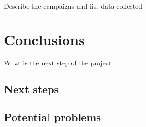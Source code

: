 \documentclass{nwureport}
\begin{document}
Describe the campaigns and list data collected


\chapter{Conclusions}

What is the next step of the project 

\section{Next steps}

\section{Potential problems}


\begin{spacing}{0.3}
\linespread{0.8} \normalsize

\end{spacing}
\end{document}
